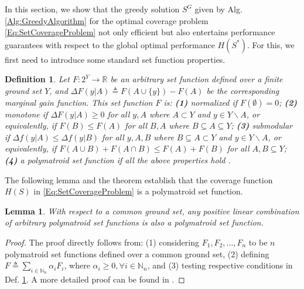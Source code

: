 \documentclass[letterpaper, 10 pt, conference]{ieeeconf}
\newcommand{\R}{\mathbb{R}}
\newcommand{\N}{\mathbb{N}}
\newtheorem{lemma}{Lemma}
\newtheorem{definition}{Definition}
\begin{document}
In this section, we show that the greedy solution $S^G$ given by Alg. \ref{Alg:GreedyAlgorithm} for the optimal coverage problem \eqref{Eq:SetCoverageProblem} not only efficient but also entertains performance guarantees with respect to the global optimal performance $H(S^*)$. For this, we first need to introduce some standard set function properties.


\begin{definition} \cite{WelikalaJ02021} \label{Def:Submodularity} 
Let $F:2^Y \rightarrow \R$ be an arbitrary set function defined over a finite ground set $Y$, and $\Delta F(y \vert A) \triangleq F(A\cup\{y\}) - F(A)$ be the corresponding marginal gain function. This set function $F$ is:
\textbf{(1)} \emph{normalized} if $F(\emptyset) = 0$; 
\textbf{(2)} \emph{monotone} if $\Delta F(y \vert A)\geq 0$ for all $y,A$ where $A \subset Y$ and $y\in Y\backslash A$, or equivalently, if $F(B) \leq F(A)$ for all $B,A$ where $B \subseteq A \subseteq Y$;
\textbf{(3)} \emph{submodular} if $\Delta f(y\vert A) \leq \Delta f(y\vert B)$ for all $y,A,B$ where $B\subseteq A \subset Y$ and $y\in Y \backslash A$, or equivalently, if $F(A\cup B) + F(A\cap B) \leq F(A) + F(B)$ for all $A,B\subseteq Y$;  
\textbf{(4)} a \emph{polymatroid} set function if all the above properties hold \cite{Boros2003}. 
\end{definition}


The following lemma and the theorem establish that the coverage function $H(S)$ in \eqref{Eq:SetCoverageProblem} is a polymatroid set function.



\begin{lemma}\label{Lm:LinearityOfSubmodularity}
With respect to a common ground set, any positive linear combination of arbitrary polymatroid set functions is also a polymatroid set function.    
\end{lemma}
\begin{proof}
The proof directly follows from: (1) considering $F_1,F_2,\ldots,F_n$ to be $n$ polymatroid set functions defined over a common ground set, (2) defining $F\triangleq \sum_{i\in\N_n} \alpha_i F_i$, where $\alpha_i \geq 0, \forall i \in\N_n$, and (3) testing respective conditions in Def. \ref{Def:Submodularity}. A more detailed proof can be found in \cite{Welikala2024Ax1}. 
\end{proof}
\end{document}
